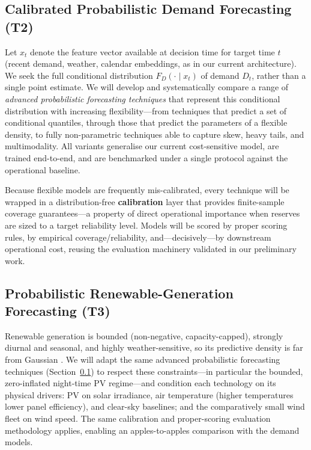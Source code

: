 \documentclass[12pt,a4paper]{article}
\begin{document}
\subsection{Calibrated Probabilistic Demand Forecasting (T2)}
\label{sec:demand}

Let $x_t$ denote the feature vector available at decision time for target time $t$
(recent demand, weather, calendar embeddings, as in our current architecture). We seek the
full conditional distribution $F_{D}(\cdot \mid x_t)$ of demand $D_t$, rather than a single
point estimate. We will develop and systematically compare a range of \emph{advanced
probabilistic forecasting techniques} that represent this conditional distribution with
increasing flexibility---from techniques that predict a set of conditional quantiles,
through those that predict the parameters of a flexible density, to fully non-parametric
techniques able to capture skew, heavy tails, and multimodality. All variants generalise
our current cost-sensitive model, are trained end-to-end, and are benchmarked under a
single protocol against the operational baseline.

Because flexible models are frequently mis-calibrated, every technique will be wrapped in
a distribution-free \textbf{calibration} layer that provides finite-sample coverage
guarantees---a property of direct operational importance when reserves are sized to a
target reliability level. Models will be scored by proper scoring rules, by empirical
coverage/reliability, and---decisively---by downstream operational cost, reusing the
evaluation machinery validated in our preliminary work.

\subsection{Probabilistic Renewable-Generation Forecasting (T3)}
\label{sec:renewable}

Renewable generation is bounded (non-negative, capacity-capped), strongly diurnal and
seasonal, and highly weather-sensitive, so its predictive density is far from Gaussian
\parencite{antonanzas2016review,hong2020energy}. We will adapt the same advanced
probabilistic forecasting techniques (Section~\ref{sec:demand}) to respect these
constraints---in particular the bounded, zero-inflated night-time PV regime---and condition
each technology on its physical drivers: PV on solar irradiance, air temperature (higher
temperatures lower panel efficiency), and clear-sky baselines; and the comparatively small
wind fleet on wind speed. The same calibration and proper-scoring evaluation methodology
applies, enabling an apples-to-apples comparison with the demand models.
\end{document}
